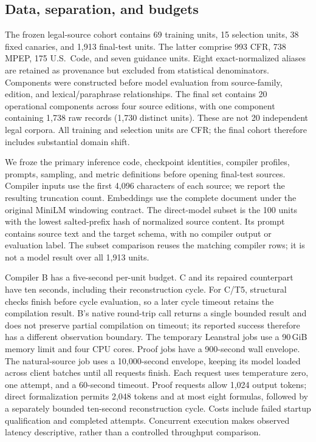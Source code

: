 \documentclass{article}
\begin{document}
\subsection{Data, separation, and budgets}
The frozen legal-source cohort contains 69 training units, 15 selection units, 38 fixed canaries, and 1,913 final-test units. The latter comprise 993 CFR, 738 MPEP, 175 U.S.\ Code, and seven guidance units. Eight exact-normalized aliases are retained as provenance but excluded from statistical denominators. Components were constructed before model evaluation from source-family, edition, and lexical/paraphrase relationships. The final set contains 20 operational components across four source editions, with one component containing 1,738 raw records (1,730 distinct units). These are not 20 independent legal corpora. All training and selection units are CFR; the final cohort therefore includes substantial domain shift.

We froze the primary inference code, checkpoint identities, compiler profiles, prompts, sampling, and metric definitions before opening final-test sources. Compiler inputs use the first 4,096 characters of each source; we report the resulting truncation count. Embeddings use the complete document under the original MiniLM windowing contract. The direct-model subset is the 100 units with the lowest salted-prefix hash of normalized source content. Its prompt contains source text and the target schema, with no compiler output or evaluation label. The subset comparison reuses the matching compiler rows; it is not a model result over all 1,913 units.

Compiler B has a five-second per-unit budget. C and its repaired counterpart have ten seconds, including their reconstruction cycle. For C/T5, structural checks finish before cycle evaluation, so a later cycle timeout retains the compilation result. B's native round-trip call returns a single bounded result and does not preserve partial compilation on timeout; its reported success therefore has a different observation boundary. The temporary Leanstral jobs use a 90\,GiB memory limit and four CPU cores. Proof jobs have a 900-second wall envelope. The natural-source job uses a 10,000-second envelope, keeping its model loaded across client batches until all requests finish. Each request uses temperature zero, one attempt, and a 60-second timeout. Proof requests allow 1,024 output tokens; direct formalization permits 2,048 tokens and at most eight formulas, followed by a separately bounded ten-second reconstruction cycle. Costs include failed startup qualification and completed attempts. Concurrent execution makes observed latency descriptive, rather than a controlled throughput comparison.
\end{document}

